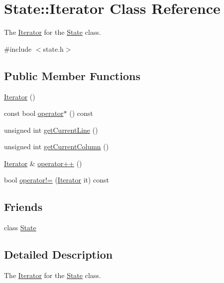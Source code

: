 \hypertarget{class_state_1_1_iterator}{}\section{State\+:\+:Iterator Class Reference}
\label{class_state_1_1_iterator}


The \mbox{\hyperlink{class_state_1_1_iterator}{Iterator}} for the \mbox{\hyperlink{class_state}{State}} class.  




{\ttfamily \#include $<$state.\+h$>$}

\subsection*{Public Member Functions}
\begin{DoxyCompactItemize}
\item 
\mbox{\hyperlink{class_state_1_1_iterator_a54547209d50ec7db6bc7303c338573e3}{Iterator}} ()
\item 
const bool \mbox{\hyperlink{class_state_1_1_iterator_ac3ce2db518495ab2cb563bfba62a79c1}{operator$\ast$}} () const
\item 
unsigned int \mbox{\hyperlink{class_state_1_1_iterator_a48187cf44203889ba25ea78eee4de895}{get\+Current\+Line}} ()
\item 
unsigned int \mbox{\hyperlink{class_state_1_1_iterator_a9cbebe63fd8659b3330c68c9be7b7278}{get\+Current\+Column}} ()
\item 
\mbox{\hyperlink{class_state_1_1_iterator}{Iterator}} \& \mbox{\hyperlink{class_state_1_1_iterator_a0e1e8b3a2b802a43f5436eccfb15b9a7}{operator++}} ()
\item 
bool \mbox{\hyperlink{class_state_1_1_iterator_a31bf32bb11ba3294a3bc79ff27788998}{operator!=}} (\mbox{\hyperlink{class_state_1_1_iterator}{Iterator}} it) const
\end{DoxyCompactItemize}
\subsection*{Friends}
\begin{DoxyCompactItemize}
\item 
class \mbox{\hyperlink{class_state_1_1_iterator_a7edbf9e31116a21e4e18cd2dd004ae63}{State}}
\end{DoxyCompactItemize}


\subsection{Detailed Description}
The \mbox{\hyperlink{class_state_1_1_iterator}{Iterator}} for the \mbox{\hyperlink{class_state}{State}} class. 

